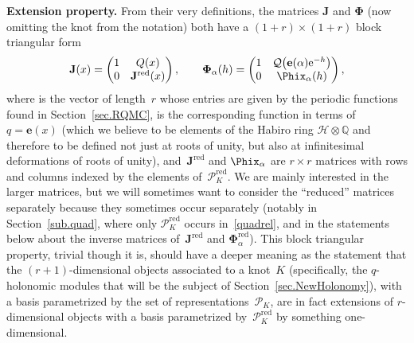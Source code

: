 \documentclass[pdftex]{sigma}
\numberwithin{equation}{section}
\def\calP{\mathcal P}
\def\calH{\mathcal H}
\def\calP{\mathcal P}
\def\e{\mathbf{e}}
\def\a{\alpha}
\def\Q{\mathbb Q}
\def\e{\mathbf{e}}
\def\a{\alpha}
\def\s{\sigma}
\def\be{\begin{equation}}
\def\ee{\end{equation}}
\def\sQ{\mathcal{Q}}
\def\bJ{J} \def\bJ{\mathbf{J}}
\def\bPhi{\mathbf\Phi}
\def\RED{^{\text{red}}}
\def\bJx{\bJ\RED} %
\def\calPx{\mathcal{P}\RED} %
\begin{document}
{\bf Extension property.}
From their very definitions, the matrices $\bJ$ and $\bPhi$ (now omitting the knot from
the notation) both have a $(1+r)\times(1+r)$ block triangular form
\be
\label{Jblock}
\bJ(x) = \begin{pmatrix} 1 & Q(x) \\
 0 & \bJx(x) \end{pmatrix} , \qquad
\bPhi_\a(h) = \begin{pmatrix} 1 & \sQ\bigl(\e(\a){\rm e}^{-h}\bigr) \\
0 & \Phix_\a(h) \end{pmatrix} ,
\ee
where \smash{$Q(x)=\bigl(Q^{(\s)}(x)\bigr)_{\s\in\calPx_K}$} is the vector of length~$r$
whose entries are given by the periodic functions found in Section~\ref{sec.RQMC},
\smash{$\sQ(q)=\bigl(\sQ^{(\s)}(q)\bigr)_{\s\in\calPx_K}$} is the corresponding function
in terms of~${q=\e(x)}$ (which we believe to be elements of the Habiro ring
$\calH\otimes\Q$ and therefore to be defined not just at roots of unity, but also at
infinitesimal deformations of roots of unity), and~$\bJx$ and $\Phix_\a$ are $r\times r$
matrices with rows and columns indexed by the elements of~$\calPx_K$. We are mainly
interested in the larger matrices, but we will sometimes want to consider the ``reduced''
matrices separately because they sometimes occur separately (notably in
Section~\ref{sub.quad}, where only $\calPx_K$ occurs in~\eqref{quadrel}, and in the
statements below about the inverse matrices of~$\bJ\RED$ and $\bPhi_\a\RED$). This
block triangular property, trivial though it is, should have a deeper meaning as the
statement that the $(r+1)$-dimensional objects associated to a knot~$K$ (specifically,
the $q$-holonomic modules that will be the subject of Section~\ref{sec.NewHolonomy}),
with a basis parametrized by the set of representations~$\calP_K$, are in fact
extensions of $r$-dimensional objects with a basis parametrized by~$\calPx_K$
by something one-dimensional.
\end{document}
